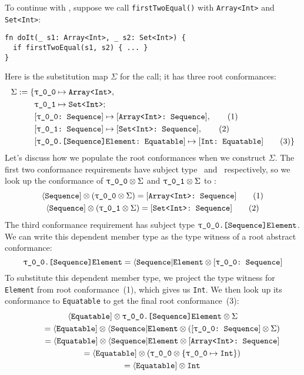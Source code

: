 \documentclass[../generics]{subfiles}
\begin{document}
\begin{example}\label{abstract conformance example 2}
To continue with , suppose we call \texttt{firstTwoEqual()} with \texttt{Array<Int>} and \texttt{Set<Int>}:
\begin{Verbatim}
fn doIt(_ s1: Array<Int>, _ s2: Set<Int>) {
  if firstTwoEqual(s1, s2) { ... }
}
\end{Verbatim}
Here is the substitution map $\Sigma$ for the call; it has three root conformances:
\begin{align*}
\Sigma := \{
&\SubstType{\rT}{Array<Int>},\\
&\SubstType{\rU}{Set<Int>};\\
&\SubstConf{\rT}{Array<Int>}{Sequence},\tag{1}\\
&\SubstConf{\rU}{Set<Int>}{Sequence},\tag{2}\\
&\SubstConf{\rT.[Sequence]Element}{Int}{Equatable}\tag{3}
\}
\end{align*}
Let's discuss how we populate the root conformances when we construct $\Sigma$. The first two conformance requirements have subject type \rT\ and \rU\ respectively, so we look up the conformance of $\rT\otimes\Sigma$ and $\rU\otimes\Sigma$ to \tSequence:
\begin{gather*}
\PSequence \otimes (\rT \otimes \Sigma) = \ConfReq{Array<Int>}{Sequence}\tag{1}\\
\PSequence \otimes (\rU \otimes \Sigma) = \ConfReq{Set<Int>}{Sequence}\tag{2}
\end{gather*}
The third conformance requirement has subject type $\texttt{\rT.[Sequence]Element}$. We can write this dependent member type as the type witness of a root abstract conformance:
\[\texttt{\rT.[Sequence]Element} = \AElement \otimes \rTSequence\]
To substitute this dependent member type, we project the type witness for \texttt{Element} from root conformance~(1), which gives us \texttt{Int}. We then look up its conformance to \texttt{Equatable} to get the final root conformance~(3):
\begin{gather*}
\Proto{Equatable} \otimes \texttt{\rT.[Sequence]Element} \otimes \Sigma\\
\qquad {} = \Proto{Equatable} \otimes \AElement \otimes (\rTSequence \otimes \Sigma)\\
\qquad {} = \Proto{Equatable} \otimes \AElement \otimes \ConfReq{Array<Int>}{Sequence}\\
\qquad {} = \Proto{Equatable} \otimes (\rT \otimes \SubMapInt)\\
\qquad {} = \Proto{Equatable} \otimes \texttt{Int}\\

\end{gather*}
\end{example}
\end{document}
